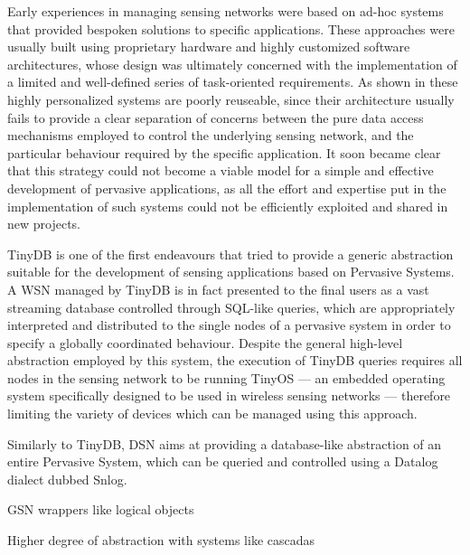 Early experiences in managing sensing networks were based on ad-hoc systems
that provided bespoken solutions to specific applications. These approaches
were usually built using proprietary hardware and highly customized software
architectures, whose design was ultimately concerned with the implementation of
a limited and well-defined series of task-oriented requirements. As shown in
\cite{hartung2006firewxnet} \cite{mainwaring2002wireless}
\cite{werner2005monitoring} \cite{juang2002energy} these highly personalized
systems are poorly reuseable, since their architecture usually fails to provide
a clear separation of concerns between the pure data access mechanisms employed
to control the underlying sensing network, and the particular behaviour
required by the specific application. It soon became clear that this strategy
could not become a viable model for a simple and effective development of
pervasive applications, as all the effort and expertise put in the
implementation of such systems could not be efficiently exploited and shared in
new projects.

TinyDB \cite{madden2005tinydb} is one of the first endeavours that tried to
provide a generic abstraction suitable for the development of sensing
applications based on Pervasive Systems. A WSN managed by TinyDB is in fact
presented to the final users as a vast streaming database controlled through
SQL-like queries, which are appropriately interpreted and distributed to the
single nodes of a pervasive system in order to specify a globally coordinated
behaviour. Despite the general high-level abstraction employed by this system,
the execution of TinyDB queries requires all nodes in the sensing network to be
running TinyOS \cite{levis2005tinyos} --- an embedded operating system
specifically designed to be used in wireless sensing networks --- therefore
limiting the variety of devices which can be managed using this approach.

Similarly to TinyDB, DSN \cite{chu2006entirely} aims at providing a
database-like abstraction of an entire Pervasive System, which can be queried
and controlled using a Datalog dialect dubbed Snlog.




GSN wrappers like logical objects

Higher degree of abstraction with systems like cascadas
